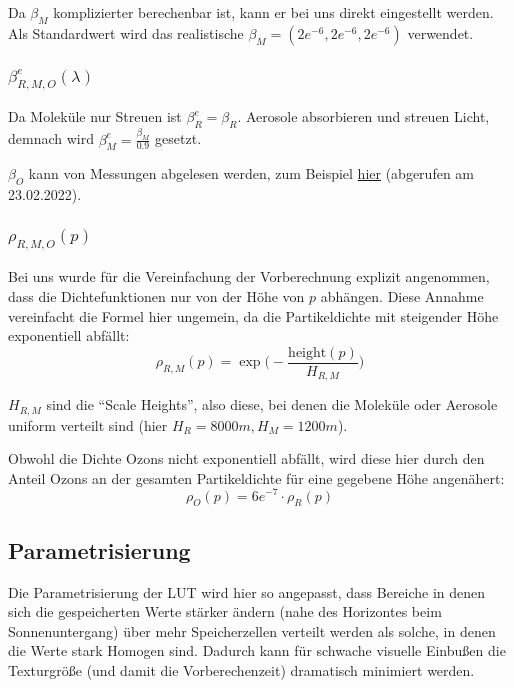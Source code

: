 Da $\beta_M$ komplizierter berechenbar ist, kann er bei uns direkt eingestellt werden. Als Standardwert wird
das realistische $\beta_M=(2e^{-6},2e^{-6},2e^{-6})$ verwendet.

\subsubsection{$\beta^e_{R,M,O}(\lambda)$}
Da Moleküle nur Streuen ist $\beta^e_R = \beta_R$. Aerosole absorbieren und streuen Licht, demnach wird $\beta^e_M =
\frac{\beta_M}{0.9}$ gesetzt.

$\beta_O$ kann von Messungen abgelesen werden, zum Beispiel
\href{https://www.iup.uni-bremen.de/gruppen/molspec/downloads/serdyuchenkogorshelev5digits.dat}{hier} (abgerufen am
23.02.2022).

\subsubsection{$\rho_{R,M,O}(p)$}
Bei uns wurde für die Vereinfachung der Vorberechnung explizit angenommen, dass die Dichtefunktionen nur von der Höhe
von $p$ abhängen. Diese Annahme vereinfacht die Formel hier ungemein, da die Partikeldichte mit steigender Höhe
exponentiell abfällt:
\begin{equation*}
	\rho_{R,M}(p) = \exp\bigg(-\frac{\text{height}(p)}{H_{R,M}}\bigg)
\end{equation*}

$H_{R,M}$ sind die \enquote{Scale Heights}, also diese, bei denen die Moleküle oder Aerosole uniform verteilt sind (hier
$H_R=8000m, H_M=1200m$).

Obwohl die Dichte Ozons nicht exponentiell abfällt, wird diese hier durch den Anteil Ozons an der gesamten Partikeldichte
für eine gegebene Höhe angenähert:
\begin{equation*}
	\rho_O(p) = 6e^{-7} \cdot \rho_R(p)
\end{equation*}

\subsection{Parametrisierung} \label{ssec:params}
Die Parametrisierung der LUT wird hier so angepasst, dass Bereiche in denen sich die gespeicherten Werte stärker ändern 
(nahe des Horizontes beim Sonnenuntergang) über mehr Speicherzellen verteilt werden als solche, in denen die Werte stark
Homogen sind. Dadurch kann für schwache visuelle Einbußen die Texturgröße (und damit die Vorberechenzeit) dramatisch
minimiert werden.

